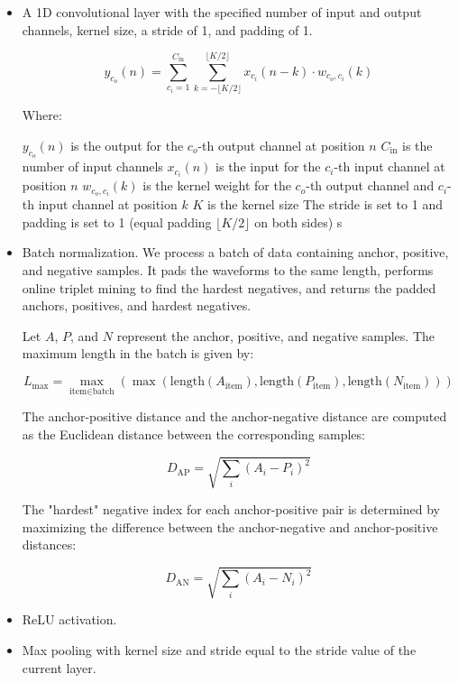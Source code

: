 \begin{itemize}
    \item A 1D convolutional layer with the specified number of input and output channels, kernel size, a stride of 1, and padding of 1.

    \begin{equation}
y_{c_o}(n) = \sum_{c_i=1}^{C_{\text{in}}} \sum_{k=-\lfloor K/2 \rfloor}^{\lfloor K/2 \rfloor} x_{c_i}(n - k) \cdot w_{c_o, c_i}(k)
\end{equation}

Where:

$y_{c_o}(n)$ is the output for the $c_o$-th output channel at position $n$
$C_{\text{in}}$ is the number of input channels
$x_{c_i}(n)$ is the input for the $c_i$-th input channel at position $n$
$w_{c_o, c_i}(k)$ is the kernel weight for the $c_o$-th output channel and $c_i$-th input channel at position $k$
$K$ is the kernel size
The stride is set to 1 and padding is set to 1 (equal padding $\lfloor K/2 \rfloor$ on both sides)
s
    \item Batch normalization. We process a batch of data containing anchor, positive, and negative samples. It pads the waveforms to the same length, performs online triplet mining to find the hardest negatives, and returns the padded anchors, positives, and hardest negatives.

    Let $A$, $P$, and $N$ represent the anchor, positive, and negative samples. The maximum length in the batch is given by:

    \begin{equation}
L_{\text{max}} = \max_{\text{item} \in \text{batch}}(\max(\text{length}(A_{\text{item}}), \text{length}(P_{\text{item}}), \text{length}(N_{\text{item}})))
\end{equation}

    The anchor-positive distance and the anchor-negative distance are computed as the Euclidean distance between the corresponding samples:

    \begin{equation}
D_{\text{AP}} = \sqrt{\sum_{i} (A_i - P_i)^2}
\end{equation}

    The "hardest" negative index for each anchor-positive pair is determined by maximizing the difference between the anchor-negative and anchor-positive distances:

    \begin{equation}
D_{\text{AN}} = \sqrt{\sum_{i} (A_i - N_i)^2}
\end{equation}

    
    \item ReLU activation. 

    
    \item Max pooling with kernel size and stride equal to the stride value of the current layer.
\end{itemize}

